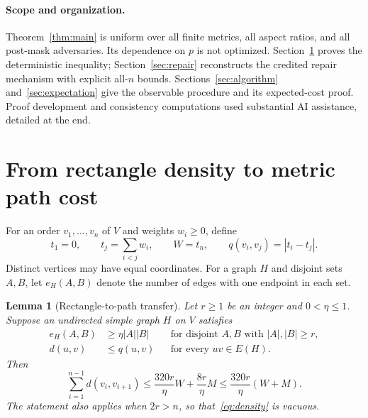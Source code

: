 \documentclass[acmlarge,screen,nonacm,11pt]{acmart}
\newtheorem{lemma}[theorem]{Lemma}
\begin{document}
\paragraph{Scope and organization.}
Theorem~\ref{thm:main} is uniform over all finite metrics, all aspect ratios, and all post-mask adversaries. Its dependence on $p$ is not optimized. Section~\ref{sec:transfer} proves the deterministic inequality; Section~\ref{sec:repair} reconstructs the credited repair mechanism with explicit all-$n$ bounds. Sections~\ref{sec:algorithm} and~\ref{sec:expectation} give the observable procedure and its expected-cost proof. Proof development and consistency computations used substantial AI assistance, detailed at the end.

\clearpage
\section{From rectangle density to metric path cost}\label{sec:transfer}
For an order $v_1,\ldots,v_n$ of $V$ and weights $w_i\geq0$, define
\[
 t_1=0,\qquad t_j=\sum_{i<j}w_i,\qquad W=t_n,
 \qquad q(v_i,v_j)=|t_i-t_j|.
\]
Distinct vertices may have equal coordinates. For a graph $H$ and disjoint sets $A,B$, let $e_H(A,B)$ denote the number of edges with one endpoint in each set.

\begin{lemma}[Rectangle-to-path transfer]\label{lem:transfer}
Let $r\geq1$ be an integer and $0<\eta\leq1$. Suppose an undirected simple graph $H$ on $V$ satisfies
\begin{align}
 e_H(A,B)&\geq\eta|A||B|&&\text{for disjoint }A,B\text{ with }|A|,|B|\geq r,\label{eq:density}\\
 d(u,v)&\leq q(u,v)&&\text{for every }uv\in E(H).\label{eq:domination}
\end{align}
Then
\begin{equation}\label{eq:transfer}
 \sum_{i=1}^{n-1}d(v_i,v_{i+1})
 \leq\frac{320r}{\eta}W+\frac{8r}{\eta}M
 \leq\frac{320r}{\eta}(W+M).
\end{equation}
The statement also applies when $2r>n$, so that~\eqref{eq:density} is vacuous.
\end{lemma}
\end{document}
